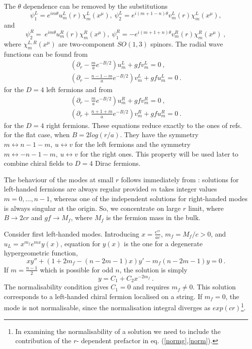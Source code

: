 \documentclass[a4paper,12pt]{article}
\begin{document}
The $\theta$ dependence can be removed by the substitutions
\begin{equation}
\psi_1^L=e^{im\theta}u_m^L(r)\chi_m^L(x^\mu),~
\psi_2^L=e^{i(m+1-n)\theta}v_m^L(r)\chi_m^L(x^\mu),
\label{leftsub}
\end{equation}
and
\begin{equation}
\psi_2^R=~e^{im\theta}u_m^R(r)\chi_m^R(x^\mu),~
\psi_1^R=-e^{i(m+1+n)\theta}v_m^R(r)\chi_m^R(x^\mu)~,
\end{equation}
where $\chi_m^{L,R}(x^\mu)$ are two-component $SO(1,3)$
spinors. 
The radial wave functions can be found from
\begin{eqnarray}
\left(\partial_r -\frac{m}{a}e^{-B/2}\right)u_m^L +gf v_m^L=0~,
\label{jr}\\
\nonumber
\left(\partial_r -\frac{n-1-m}{a}e^{-B/2}\right)v_m^L +gf
u_m^L=0~.
\end{eqnarray}
for the $D=4$ left fermions and from
\begin{eqnarray}
\left(\partial_r -\frac{m}{a}e^{-B/2}\right)u_m^R +gf v_m^R=0~,
\label{jl}\\
\nonumber
\left(\partial_r +\frac{n+1+m}{a}e^{-B/2}\right)v_m^R +gf
u_m^R=0~.
\end{eqnarray}
for the $D=4$ right fermions. These equations reduce exactly to the
ones of  refs. \cite{Jackiw:1981ee,Libanov:2000uf}  for the flat
case, when $B = 2 log(r/a)$. They have the symmetry $m
\leftrightarrow n-1-m,~u \leftrightarrow v$ for the left fermions and
the symmetry $m\leftrightarrow -n-1-m,~u \leftrightarrow v$ for the
right ones. This property will be used later to combine chiral fields
to $D=4$ Dirac fermions.

The behaviour of the modes at small $r$ follows immediately from
\cite{Jackiw:1981ee}: solutions for left-handed fermions are always
regular provided $m$ takes integer values $m=0,\dots,n-1$, whereas
one of the independent solutions for right-handed modes is always
singular at the origin. So, we concentrate on large $r$ limit, where
$B\to 2cr$ and $gf \to M_f$, where $M_f$ is the fermion mass in the
bulk. 

Consider first left-handed modes. Introducing $x=\frac{e^{cr}}{ac}$,
$m_f=M_f/c>0$, and $u_{L}=x^{m_f}e^{mx}y(x)$, equation for $y(x)$ is
the one for a degenerate hypergeometric function,
\begin{equation}
xy'' +\left(1+2m_f -(n-2m-1)x\right)y' -m_f(n-2m-1)y=0~.
\label{hyper}
\end{equation}
If $m=\frac{n-1}{2}$ which is possible for odd $n$, the solution is
simply
\begin{equation}
y=C_1+C_2x^{-2m_f}~.
\end{equation}
The normalisability condition gives $C_1=0$ and requires $m_f \neq
0$. This solution corresponds to a left-handed chiral fermion
localised on a string. If $m_f = 0$, the mode is not normalisable,
since the normalisation integral diverges as $exp(cr)$\footnote{In
examining the normalisability of a solution we need to include the
contribution of the $r$- dependent prefactor in eq.
(\ref{normg},\ref{norm}).}.
\end{document}
